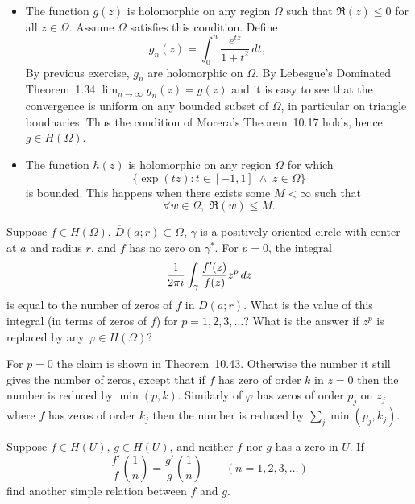 \begin{enumerate}
\begin{itemize}
\item
The function \(g(z)\) is holomorphic on any region \(\Omega\) 
such that \(\Re(z)\leq 0\) for all \(z\in\Omega\).
Assume \(\Omega\) satisfies this condition.
Define
\begin{equation*}
g_n(z) = \int_0^n \frac{e^{tz}}{1+t^2}\,dt, \qquad
\end{equation*}
By previous exercise, \(g_n\) are holomorphic on \(\Omega\).
By Lebesgue's Dominated Theorem~1.34 
\(\lim_{n\to\infty} g_n(z) = g(z)\) and it is easy to see that 
the convergence is uniform on any bounded subset of \(\Omega\),
in particular on triangle boudnaries. Thus the condition
of Morera's Theorem~10.17 holds, hence \(g\in H(\Omega)\). 

\item The function \(h(z)\) is holomorphic on any region \(\Omega\) for which 
\begin{equation*}
\{\exp(tz): t\in[-1,1] \;\wedge\; z\in\Omega\}
\end{equation*}
is bounded. This happens when there exists some \(M<\infty\) such that 
\begin{equation*}
\forall w\in\Omega,\;\Re(w) \leq M.
\end{equation*}

\end{itemize}

\begin{excopy}
Suppose \(f\in H(\Omega)\),
\(\overline{D}(a;r)\subset \Omega\),
\(\gamma\) is a positively oriented circle with center at $a$ and radius $r$,
and $f$ has no zero on \(\gamma^*\). For \(p=0\), the integral
\begin{equation*}
\frac{1}{2\pi i} \int_\gamma \frac{f'(z)}{f(z)} z^p\,dz
\end{equation*}
is equal to the number of zeros of $f$ in \(D(a;r)\).
What is the value of this integral (in terms of zeros of $f$)
for \(p=1,2,3,\ldots\)?
What is the answer if \(z^p\) is replaced by any \(\varphi\in H(\Omega)\)?
\end{excopy}

For \(p = 0\) the claim is shown in Theorem~10.43.
Otherwise the number it still gives the number of zeros,
except that if $f$ has zero of order $k$ in \(z=0\) then 
the number is reduced by \(\min(p, k)\).
Similarly of \(\varphi\) has zeros of order \(p_j\) on \(z_j\)
where $f$ has zeros of order \(k_j\)
then the number is reduced by \(\sum_j \min(p_j,k_j)\).


\begin{excopy}
Suppose \(f\in H(U)\), \(g\in H(U)\),
and neither $f$ nor $g$ has a zero in $U$. If
\begin{equation*}
\frac{f'}{f}\left(\frac{1}{n}\right) =
\frac{g'}{g}\left(\frac{1}{n}\right)
\qquad (n=1,2,3,\ldots)
\end{equation*}
find another simple relation between $f$ and $g$.
\end{excopy}


\end{enumerate}
